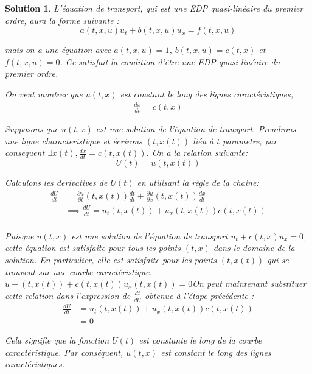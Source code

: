 \documentclass[10pt]{article}
\theoremstyle{frenchstyle}
\newtheorem{solution}{Solution}
\begin{document}
\begin{solution}
    L'équation de transport, qui est une EDP quasi-linéaire du premier ordre, aura la forme suivante :
    \begin{equation*}
        a(t, x, u)u_t + b(t, x, u)u_x = f(t, x, u)
    \end{equation*}

    mais on a une équation avec $a(t, x, u) = 1$, $b(t, x, u) = c(t, x)$ et $f(t, x, u) = 0$. Ce satisfait la condition d'être une EDP quasi-linéaire du premier ordre.
	
	On veut montrer que $u(t, x)$ est constant le long des lignes caractéristiques,
    \begin{align*}
        \frac{dx}{dt} = c(t,x)
    \end{align*}

    Supposons que $u(t, x)$ est une solution de l'équation de transport. Prendrons une ligne characteristique et écrirons $(t,x(t))$ liéu à $t$ parametre, par consequent $\exists x(t), \frac{dx}{dt}=c(t,x(t))$. On a la relation suivante:
    \[
        U(t)=u(t,x(t))
    \]

    Calculons les derivatives de $U(t)$ en utilisant la règle de la chaine:
    \begin{align*}
        \frac{dU}{dt}&=\frac{\partial u}{\partial t}(t,x(t))\frac{dt}{dt}+\frac{\partial u}{\partial x}(t,x(t))\frac{dx}{dt}\\
        &\implies \frac{dU}{dt} = u_t(t,x(t)) + u_x(t,x(t))c(t,x(t))\\
    \end{align*}

    Puisque $u(t,x)$ est une solution de l'équation de transport $u_t+c(t,x)u_x=0$, cette équation est satisfaite pour tous les points $(t,x)$ dans le domaine de la solution. En particulier, elle est satisfaite pour les points $(t,x(t))$ qui se trouvent sur une courbe caractéristique. $u+(t,x(t))+c(t,x(t))u_x(t,x(t))=0$On peut maintenant substituer cette relation dans l'expression de $\frac{dt}{dU}$ obtenue à l'étape précédente :
    \begin{align*}
        \frac{dU}{dt} &= u_t(t,x(t)) + u_x(t,x(t))c(t,x(t))\\
        &= 0
    \end{align*}
    
    Cela signifie que la fonction $U(t)$ est constante le long de la courbe caractéristique. Par conséquent, $u(t,x)$ est constant le long des lignes caractéristiques.


\end{solution}
\end{document}
